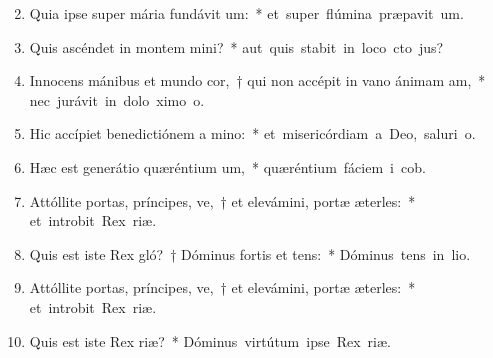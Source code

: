\begin{flushleft}
\begin{enumerate}[leftmargin=*]
\setcounter{enumi}{1}

\item Quia ipse super mária fundávit um:~* \mbox{et super flúmina præpavit um.}
\item Quis ascéndet in montem mini?~* \mbox{aut quis stabit in loco cto jus?}
\item Innocens mánibus et mundo cor,~† qui non accépit in vano ánimam am,~* \mbox{nec jurávit in dolo ximo o.}
\item Hic accípiet benedictiónem a mino:~* \mbox{et misericórdiam a Deo, saluri o.}
\item Hæc est generátio quæréntium um,~* \mbox{quæréntium fáciem i cob.}
\item Attóllite portas, príncipes, ve,~† et elevámini, portæ æterles:~* \mbox{et introbit Rex riæ.}
\item Quis est iste Rex gló?~† Dóminus fortis et tens:~* \mbox{Dóminus tens in lio.}
\item Attóllite portas, príncipes, ve,~† et elevámini, portæ æterles:~* \mbox{et introbit Rex riæ.}
\item Quis est iste Rex riæ?~* \mbox{Dóminus virtútum ipse  Rex riæ.}

\end{enumerate}
\end{flushleft}

